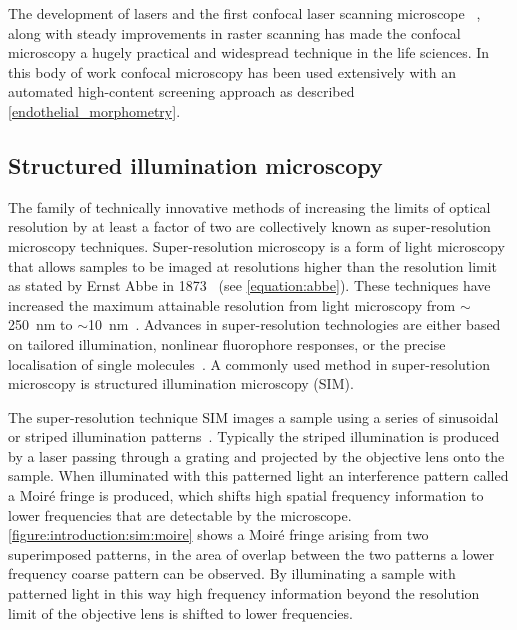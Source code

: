 The development of lasers and the first confocal laser scanning microscope~ \cite{Sheppard1977},  along with steady improvements in raster scanning has made the confocal microscopy a hugely practical and widespread technique in the life sciences. In this body of work confocal microscopy has been used extensively with an automated high-content screening approach as described \autoref{endothelial_morphometry}.

\subsection{Structured illumination microscopy}
\label{introduction:microscopy:structured_illumination_microscopy}
The family of technically innovative methods of increasing the limits of optical resolution by at least a factor of two are collectively known as super-resolution microscopy techniques. Super-resolution microscopy is a form of light microscopy that allows samples to be imaged at resolutions higher than the resolution limit as stated by Ernst Abbe in 1873~\cite{Abbe1873} (see \autoref{equation:abbe}). These techniques have increased the maximum attainable resolution from light microscopy from $\sim$\SI{250}{\nano\meter} to $\sim$\SI{10}{\nano\meter}~\cite{Galbraith2011}. Advances in super-resolution technologies are either based on tailored illumination, nonlinear fluorophore responses, or the precise localisation of single molecules~\cite{Schermelleh2010}. A commonly used method in super-resolution microscopy is structured illumination microscopy (SIM).

The super-resolution technique SIM images a sample using a series of sinusoidal or striped illumination patterns~\cite{Gustafsson2000}. Typically the striped illumination is produced by a laser passing through a grating and projected by the objective lens onto the sample. When illuminated with this patterned light an interference pattern called a Moir\'e fringe is produced, which shifts high spatial frequency information to lower frequencies that are detectable by the microscope. \autoref{figure:introduction:sim:moire} shows a Moir\'e fringe arising from two superimposed patterns, in the area of overlap between the two patterns a lower frequency coarse pattern can be observed. By illuminating a sample with patterned light in this way high frequency information beyond the resolution limit of the objective lens is shifted to lower frequencies.

